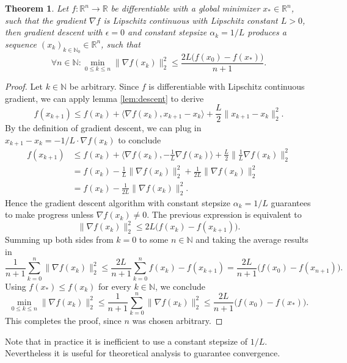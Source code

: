 \documentclass[11pt, a4paper]{article}
\newtheorem{theorem}{Theorem}[section]
\newcommand{\N}{\mathds{N}}
\newcommand{\R}{\mathds{R}}
\begin{document}
\begin{theorem} \label{thm:descent}
Let $f: \R^n \to \R$ be differentiable with a global minimizer $x_* \in \R^n$, such that the gradient $\nabla f$ is Lipschitz continuous with Lipschitz constant $L>0$, then gradient descent with $\epsilon = 0$ and constant stepsize $\alpha_k = 1/L$ produces a sequence $(x_k)_{k \in \N_0} \in \R^n$, such that 
\[ \forall n \in \N : \min_{0 \leq k \leq n} \big \| \nabla f(x_k) \big \|_2^2 \leq \frac{2L \big ( f(x_0) - f(x_*) \big )}{n+1}. \]
\end{theorem}

\begin{proof}
Let $k \in \N$ be arbitrary. Since $f$ is differentiable with Lipschitz continuous gradient, we can apply lemma \ref{lem:descent} to derive
\[  f(x_{k+1}) \leq f(x_k) + \big \langle \nabla f(x_k) , x_{k+1} -x_k \big \rangle + \frac{L}{2} \big \| x_{k+1} - x_k \big \|_2^2. \]
By the definition of gradient descent, we can plug in $x_{k+1} - x_k = - 1/L \cdot \nabla f(x_k)$ to conclude
\[ \begin{split} 
f(x_{k+1}) 
&\leq f(x_k) + \big \langle \nabla f(x_k) , - \frac{1}{L} \nabla f(x_k) \big \rangle + \frac{L}{2} \big \| \frac{1}{L} \nabla f(x_k) \big \|_2^2 \\\
&= f(x_k) - \frac{1}{L} \big \| \nabla f(x_k) \big \|_2^2 + \frac{1}{2L} \big \| \nabla f(x_k) \big \|_2^2 \\\
&= f(x_k) - \frac{1}{2L} \big \| \nabla f(x_k) \big \|_2^2.
\end{split} \]
Hence the gradient descent algorithm with constant stepsize $\alpha_k = 1/L$ guarantees to make progress unless $\nabla f(x_k) \neq 0$. The previous expression is equivalent to
\[ \big \| \nabla f(x_k) \big \|_2^2 \leq 2L \big ( f(x_k) - f(x_{k+1}) \big ). \]
Summing up both sides from $k=0$ to some $n \in \N$ and taking the average results in
\[ \frac{1}{n+1} \sum_{k=0}^{n} \big \| \nabla f(x_k) \big \|_2^2 \leq \frac{2L}{n+1} \sum_{k=0}^{n} f(x_k) - f(x_{k+1}) = \frac{2L}{n+1} \big ( f(x_0) - f(x_{n+1}) \big ). \]
Using $f(x_*) \leq f(x_k)$ for every $k \in \N$, we conclude
\[ \min_{0 \leq k \leq n} \big \| \nabla f(x_k) \big \|_2^2 \leq \frac{1}{n+1} \sum_{k=0}^{n} \big \| \nabla f(x_k) \big \|_2^2 \leq \frac{2L}{n+1} \big ( f(x_0) - f(x_*) \big ). \]
This completes the proof, since $n$ was chosen arbitrary.
\end{proof}

Note that in practice it is inefficient to use a constant stepsize of $1/L$. Nevertheless it is useful for theoretical analysis to guarantee convergence. \\
\end{document}
